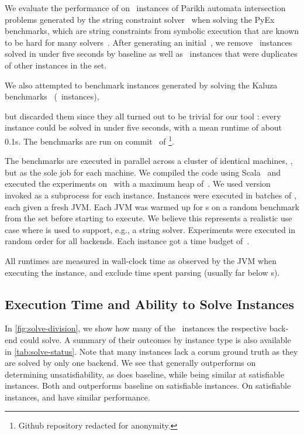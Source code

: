 
We evaluate the performance of \Catra{} on~\NrBenchmarks{} instances of Parikh
automata intersection problems generated by the \OstrichPlus{} string constraint
solver~\cite{ostrich-plus} when solving the PyEx benchmarks, 
which are string constraints from symbolic execution that are known
to be hard for many solvers~\cite{pyex}. After generating an
initial~\InitialNrBenchmarks{}, we remove~\NrTrivial{} instances solved in under
five seconds by baseline as well as~\NrInvalid{} instances that were duplicates of other instances in the set.

 We also attempted to benchmark instances generated by
\OstrichPlus{} solving the Kaluza benchmarks~\cite{Saxena10:kaluza}
(~instances),
\iffalse
and pyex-len
(\numprint{791}~instances) benchmark suites\fi
but discarded them since they all turned out to be trivial for our tool
\Catra{}: every instance
could be solved in under five seconds, with a mean runtime of about 0.1s.
The benchmarks are run
on commit~\texttt{\commit} of \Catra{}\footnote{Github repository redacted for anonymity.}.

The benchmarks are executed in parallel across a cluster of identical
machines, \BenchmarkRig{}, but as the sole job for each machine.  We compiled
the code using Scala~\ScalaVersion{} and executed the experiments
on~\JvmVersion{} with a maximum heap of~\MaxHeapSize{}. We used \Nuxmv{}
version~\NuxmvVersion{} invoked as a subprocess for each instance. Instances
were executed in batches of \BatchSize{}, each given a fresh JVM. Each JVM was
warmed up for s on a random benchmark from the set before starting
to execute. We believe this represents a realistic use case where \Calculus{} is
used to support, e.g., a string solver. Experiments were executed in random order
for all backends. Each instance got a time budget of~\RuntimeTimeout.

All runtimes are measured in wall-clock time as observed by the JVM when
executing the instance, and exclude time spent parsing (usually far below
s).

\subsection{Execution Time and Ability to Solve Instances}\label{sec:runtime}

In \cref{fig:solve-division}, we show how many of the~\NrBenchmarks{} instances
the respective back-end could solve. A summary of their outcomes by instance
type is also available in \cref{tab:solve-status}. Note that many instances lack
a corum ground truth as they are solved by only one backend. We see that
\Calculus{} generally outperforms \Nuxmv{} on determining unsatisfiability, as
does baseline, while being similar at satisfiable instances. Both \Calculus{} and
\Nuxmv{} outperforms baseline on satisfiable instances. On satisfiable
instances, \Nuxmv and \Calculus{} have similar performance.

